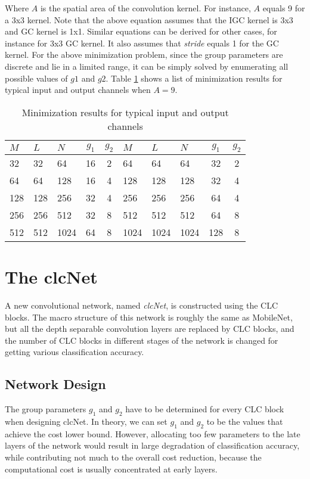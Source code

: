 \documentclass[10pt,twocolumn,letterpaper]{article}
\begin{document}
Where $A$ is the spatial area of the convolution kernel. For instance, $A$ equals 9 for a 3x3 kernel. Note that the above equation assumes that the IGC kernel is 3x3 and GC kernel is 1x1. Similar equations can be derived for other cases, for instance for 3x3 GC kernel. It also assumes that \textit{stride} equals 1 for the GC kernel. For the above minimization problem,  since the group parameters are discrete and lie in a limited range, it can be simply solved by enumerating all possible values of $g1$ and $g2$. Table \ref{tb:fcrf} shows a list of minimization results for typical input and output channels when $A=9$.
\begin{table}[h!]\scriptsize
\begin{center}
\begin{tabular}{|l|l|l||c|c|||l|l|l||c|c|}
\hline
$M$ & $L$ & $N$ & $g_1$ & $g_2$ & $M$ & $L$ & $N$ & $g_1$ & $g_2$ \\
\hline\hline
32 & 32 & 64 & 16 & 2 & 64 & 64 & 64 & 32 & 2 \\
\hline
64 & 64 & 128 & 16 & 4 & 128 & 128 & 128 & 32 & 4 \\
\hline
128 & 128 & 256 & 32 & 4 & 256 & 256 & 256 & 64 & 4 \\
\hline
256 & 256 & 512 & 32 & 8 & 512 & 512 & 512 & 64 & 8 \\
\hline
512 & 512 & 1024 & 64 & 8 & 1024 & 1024 & 1024 & 128 & 8 \\
\hline
\end{tabular}
\end{center}
\caption{Minimization results for typical input and output channels}
\label{tb:fcrf}
\end{table}

\section{The clcNet}
A new convolutional network, named  \textit{clcNet}, is constructed using the CLC blocks. The macro structure of this network is roughly the same as MobileNet, but all the depth separable convolution layers are replaced by CLC blocks, and the number of CLC blocks in different stages of the network is changed for getting various classification accuracy. 

\subsection{Network Design}

The group parameters $g_1$ and $g_2$ have to be determined for every CLC block when designing clcNet. In theory, we can set $g_1$ and $g_2$  to be the values that achieve the cost lower bound. However, allocating too few parameters to the late layers of the network would result in large degradation of classification accuracy, while contributing not much to the overall cost reduction, because the computational cost is usually concentrated at early layers. 
\end{document}

